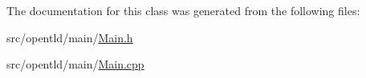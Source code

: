 The documentation for this class was generated from the following files:\begin{DoxyCompactItemize}
\item 
src/opentld/main/\hyperlink{_main_8h}{Main.h}\item 
src/opentld/main/\hyperlink{_main_8cpp}{Main.cpp}\end{DoxyCompactItemize}
